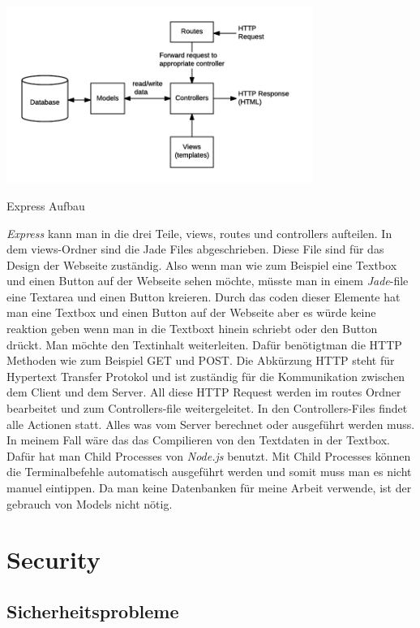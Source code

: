 \documentclass[10pt]{article}
\begin{document}
\begin{floatingfigure}[r]{11cm}
    \centering
    \includegraphics[width=10cm]{Bilder/MVCexpress.png}
    \caption{Express Aufbau \cite{05}}
    \label{fig:figlabel}
\end{floatingfigure}

\textit{Express} kann man in die drei Teile, views, routes und controllers aufteilen. In dem views-Ordner sind die Jade Files abgeschrieben. Diese File sind für das Design der Webseite zuständig. Also wenn man wie zum Beispiel eine Textbox und einen Button auf der Webseite sehen möchte, müsste man in einem \textit{Jade}-file eine Textarea und einen Button kreieren. Durch das coden dieser Elemente hat man eine Textbox und einen Button auf der Webseite aber es würde keine reaktion geben wenn man in die Textboxt hinein schriebt oder den Button drückt. Man möchte den Textinhalt weiterleiten. Dafür benötigtman die HTTP Methoden wie zum Beispiel GET und POST. Die Abkürzung HTTP steht für Hypertext Transfer Protokol und ist zuständig für die Kommunikation zwischen dem Client und dem Server.\cite{06} All diese HTTP Request werden im routes Ordner bearbeitet und zum Controllers-file weitergeleitet. In den Controllers-Files findet alle Actionen statt. Alles was vom Server berechnet oder ausgeführt werden muss. In meinem Fall wäre das das Compilieren von den Textdaten in der Textbox. Dafür hat man Child Processes  von \textit{Node.js} benutzt. Mit Child Processes können die Terminalbefehle automatisch ausgeführt werden und somit muss man es nicht manuel eintippen. Da man keine Datenbanken für meine Arbeit verwende, ist der gebrauch von Models nicht nötig. 

	
	\pagebreak
	\section{Security}
	\subsection{Sicherheitsprobleme}
\end{document}
